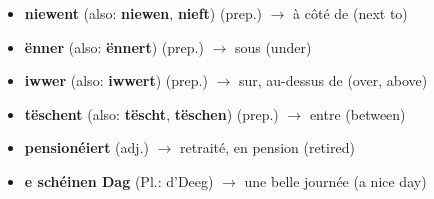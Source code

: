 \begin{itemize}
    \item \textbf{niewent} (also: \textbf{niewen}, \textbf{nieft}) (prep.) $\rightarrow$ à côté de (next to)
    \item \textbf{ënner} (also: \textbf{ënnert}) (prep.) $\rightarrow$ sous (under)
    \item \textbf{iwwer} (also: \textbf{iwwert}) (prep.) $\rightarrow$ sur, au-dessus de (over, above)
    \item \textbf{tëschent} (also: \textbf{tëscht}, \textbf{tëschen}) (prep.) $\rightarrow$ entre (between)
    \item \textbf{pensionéiert} (adj.) $\rightarrow$ retraité, en pension (retired)
    \item \textbf{e schéinen Dag} (Pl.: d'Deeg) $\rightarrow$ une belle journée (a nice day)
\end{itemize}

\vspace{1.5em}

